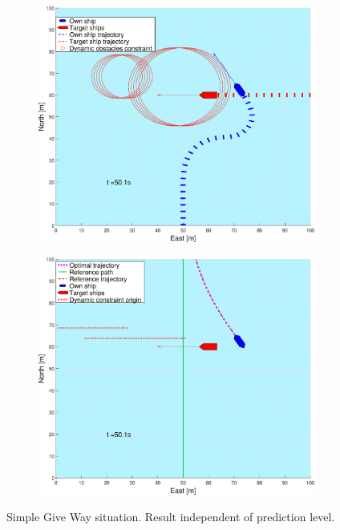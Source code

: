 \begin{figure}[ht!]
\begin{subfigure}[b]{0.499\textwidth}
        \subcaption{}
    \end{subfigure}
    \hfill
    \\
    \begin{subfigure}[b]{0.49\textwidth}
        \centering
        \includegraphics[width=\textwidth]{Images/Figures/enkel_GW/_Simple_0fig1_time=50}
        \subcaption{}
    \end{subfigure}
    \hfill
    \begin{subfigure}[b]{0.499\textwidth}
        \centering
        \includegraphics[width=\textwidth]{Images/Figures/enkel_GW/_Simple_0fig999_time=50}
        \subcaption{}
    \end{subfigure}
    \hfill
    \caption{Simple Give Way situation. Result independent of prediction level.}
    \label{FIG: simple GW}
\end{figure}%
